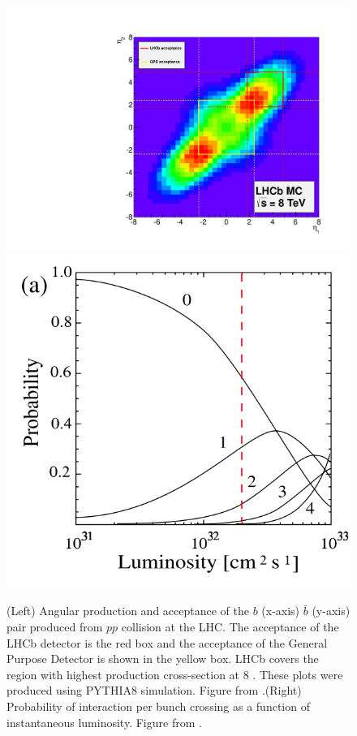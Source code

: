 \begin{figure}
	\centering
	\includegraphics[scale = 0.4]{figs/detector/Acceptance.pdf}%
	\includegraphics[scale = 0.5]{figs/detector/ProbInt.png}
	\caption{(Left) Angular production and acceptance of the $b$ (x-axis) $\bar{b}$ (y-axis) pair produced from $pp$ collision at the LHC. The acceptance of the LHCb detector is the red box and the acceptance of the General Purpose Detector is shown in the yellow box. \Gls{LHCb} covers the region with highest production cross-section at 8 \tev. These plots were produced using PYTHIA8 \cite{pythia8} simulation. Figure from \cite{acceptance}.(Right) Probability of interaction per bunch crossing as a function of instantaneous luminosity. Figure from \cite{Raven:2007zi}.}
	\label{fig:Acceptance}
\end{figure}


